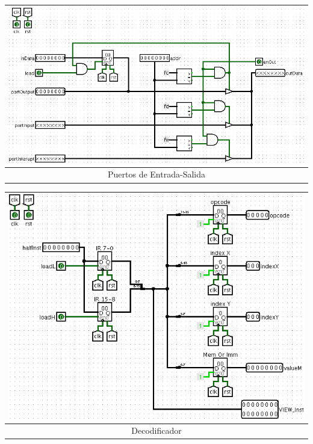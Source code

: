 \documentclass[a4paper,11pt]{article}
\begin{document}
\begin{center}
\begin{tabular}[t]{c}
\includegraphics[scale=0.3]{img/5_IOports.png}\\
\hline
Puertos de Entrada-Salida\\ \hline
\end{tabular}
\end{center}


\begin{center}
\begin{tabular}[t]{c}
\includegraphics[scale=0.3]{img/6_Decode.png}\\
\hline
Decodificador\\ \hline
\end{tabular}
\end{center}

\end{document}

